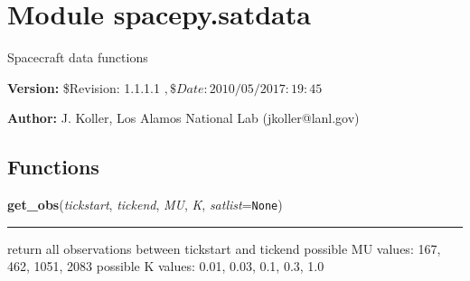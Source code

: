 %
%
%


\section{Module spacepy.satdata}

    \label{spacepy:satdata}
Spacecraft data functions

\textbf{Version:} \$Revision: 1.1.1.1 $, \$Date: 2010/05/20 17:19:45 $



\textbf{Author:} J. Koller, Los Alamos National Lab (jkoller@lanl.gov)





  \subsection{Functions}

    \label{spacepy:satdata:get_obs}

    \vspace{0.5ex}

\hspace{.8\funcindent}\begin{boxedminipage}{\funcwidth}

    \raggedright \textbf{get\_obs}(\textit{tickstart}, \textit{tickend}, \textit{MU}, \textit{K}, \textit{satlist}={\tt None})

    \vspace{-1.5ex}

    \rule{\textwidth}{0.5\fboxrule}
\setlength{\parskip}{2ex}
    return all observations between tickstart and tickend possible MU 
    values: 167, 462, 1051, 2083 possible K values: 0.01, 0.03, 0.1, 0.3, 
    1.0

\setlength{\parskip}{1ex}
    \end{boxedminipage}

